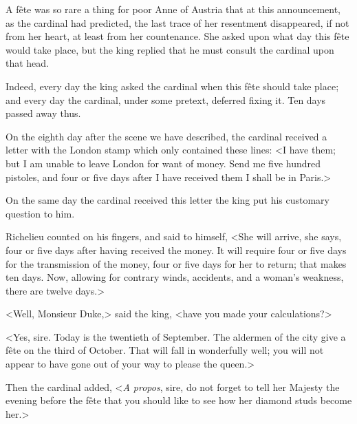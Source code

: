 A fête was so rare a thing for poor Anne of Austria that at this announcement, as the cardinal had predicted, the last trace of her resentment disappeared, if not from her heart, at least from her countenance. She asked upon what day this fête would take place, but the king replied that he must consult the cardinal upon that head. 

Indeed, every day the king asked the cardinal when this fête should take place; and every day the cardinal, under some pretext, deferred fixing it. Ten days passed away thus. 

On the eighth day after the scene we have described, the cardinal received a letter with the London stamp which only contained these lines: <I have them; but I am unable to leave London for want of money. Send me five hundred pistoles, and four or five days after I have received them I shall be in Paris.> 

On the same day the cardinal received this letter the king put his customary question to him. 

Richelieu counted on his fingers, and said to himself, <She will arrive, she says, four or five days after having received the money. It will require four or five days for the transmission of the money, four or five days for her to return; that makes ten days. Now, allowing for contrary winds, accidents, and a woman's weakness, there are twelve days.> 

<Well, Monsieur Duke,> said the king, <have you made your calculations?> 

<Yes, sire. Today is the twentieth of September. The aldermen of the city give a fête on the third of October. That will fall in wonderfully well; you will not appear to have gone out of your way to please the queen.> 

Then the cardinal added, <\textit{A propos}, sire, do not forget to tell her Majesty the evening before the fête that you should like to see how her diamond studs become her.>